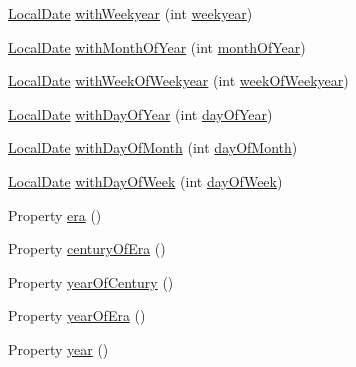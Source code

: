 \begin{DoxyCompactItemize}
\hyperlink{classorg_1_1joda_1_1time_1_1_local_date}{Local\-Date} \hyperlink{classorg_1_1joda_1_1time_1_1_local_date_a9fb16cd4e30a4c71bf4529a36d312950}{with\-Weekyear} (int \hyperlink{classorg_1_1joda_1_1time_1_1_local_date_a6895acbe2f8b0ff691f5163755086c4c}{weekyear})
\item 
\hyperlink{classorg_1_1joda_1_1time_1_1_local_date}{Local\-Date} \hyperlink{classorg_1_1joda_1_1time_1_1_local_date_af2892d035a350c0a4a0df88b7214d99e}{with\-Month\-Of\-Year} (int \hyperlink{classorg_1_1joda_1_1time_1_1_local_date_a00923ad74b6ab2f01e45d3f4804f15f7}{month\-Of\-Year})
\item 
\hyperlink{classorg_1_1joda_1_1time_1_1_local_date}{Local\-Date} \hyperlink{classorg_1_1joda_1_1time_1_1_local_date_a429904be235cc0ebce55836dd0334850}{with\-Week\-Of\-Weekyear} (int \hyperlink{classorg_1_1joda_1_1time_1_1_local_date_ad3d6323943a3c94677504f5c760a7ea4}{week\-Of\-Weekyear})
\item 
\hyperlink{classorg_1_1joda_1_1time_1_1_local_date}{Local\-Date} \hyperlink{classorg_1_1joda_1_1time_1_1_local_date_a38dc2d8a40df3589a255daa63f3f5535}{with\-Day\-Of\-Year} (int \hyperlink{classorg_1_1joda_1_1time_1_1_local_date_a6c031321a4d230964a4b5be5cc9dc47b}{day\-Of\-Year})
\item 
\hyperlink{classorg_1_1joda_1_1time_1_1_local_date}{Local\-Date} \hyperlink{classorg_1_1joda_1_1time_1_1_local_date_a6b95e28f665aa8c6110551d0661fb948}{with\-Day\-Of\-Month} (int \hyperlink{classorg_1_1joda_1_1time_1_1_local_date_a876472f9f0711437971e9b5c029b7474}{day\-Of\-Month})
\item 
\hyperlink{classorg_1_1joda_1_1time_1_1_local_date}{Local\-Date} \hyperlink{classorg_1_1joda_1_1time_1_1_local_date_a375507106903a762092fb4537155a052}{with\-Day\-Of\-Week} (int \hyperlink{classorg_1_1joda_1_1time_1_1_local_date_a9462e456874d88c9daacf4b8ea50f608}{day\-Of\-Week})
\item 
Property \hyperlink{classorg_1_1joda_1_1time_1_1_local_date_a764d21effa733f7b34333709e7526a99}{era} ()
\item 
Property \hyperlink{classorg_1_1joda_1_1time_1_1_local_date_a927abe31f4c94f94939ff1d34b702111}{century\-Of\-Era} ()
\item 
Property \hyperlink{classorg_1_1joda_1_1time_1_1_local_date_ac4c9795a96adab4eae14266dd80ffebb}{year\-Of\-Century} ()
\item 
Property \hyperlink{classorg_1_1joda_1_1time_1_1_local_date_ae0a20cf27c1dafdb02067dd8f9c06ce5}{year\-Of\-Era} ()
\item 
Property \hyperlink{classorg_1_1joda_1_1time_1_1_local_date_a0bae1887eb2fa9df0d965988d04a37de}{year} ()

\end{DoxyCompactItemize}
